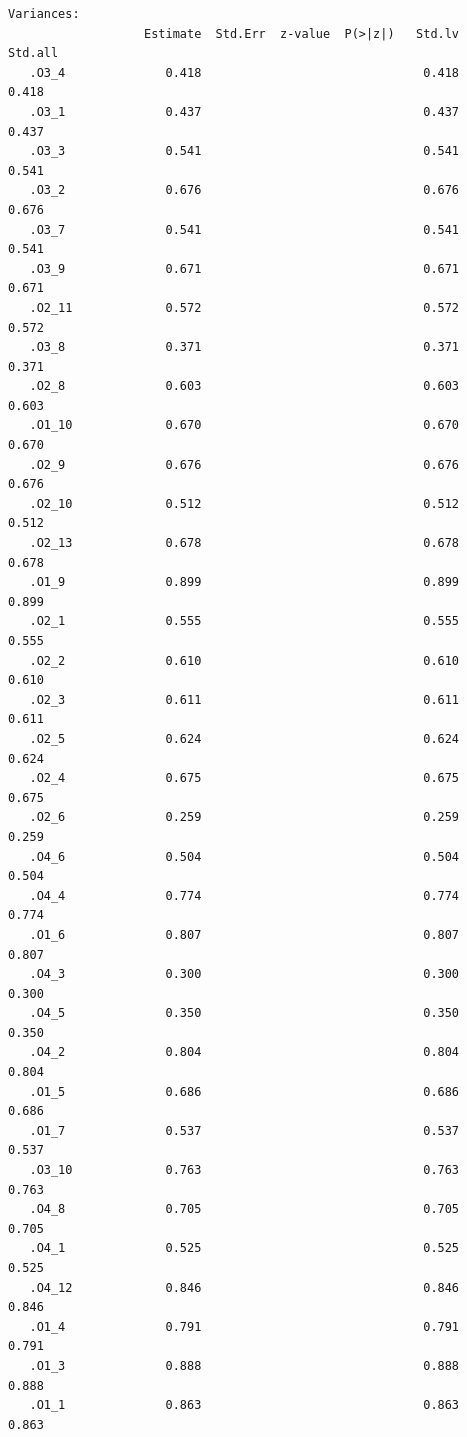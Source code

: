 \documentclass[
  letterpaper,
  DIV=11,
  numbers=noendperiod]{scrartcl}
\begin{document}
\begin{verbatim}
Variances:
                   Estimate  Std.Err  z-value  P(>|z|)   Std.lv  Std.all
   .O3_4              0.418                               0.418    0.418
   .O3_1              0.437                               0.437    0.437
   .O3_3              0.541                               0.541    0.541
   .O3_2              0.676                               0.676    0.676
   .O3_7              0.541                               0.541    0.541
   .O3_9              0.671                               0.671    0.671
   .O2_11             0.572                               0.572    0.572
   .O3_8              0.371                               0.371    0.371
   .O2_8              0.603                               0.603    0.603
   .O1_10             0.670                               0.670    0.670
   .O2_9              0.676                               0.676    0.676
   .O2_10             0.512                               0.512    0.512
   .O2_13             0.678                               0.678    0.678
   .O1_9              0.899                               0.899    0.899
   .O2_1              0.555                               0.555    0.555
   .O2_2              0.610                               0.610    0.610
   .O2_3              0.611                               0.611    0.611
   .O2_5              0.624                               0.624    0.624
   .O2_4              0.675                               0.675    0.675
   .O2_6              0.259                               0.259    0.259
   .O4_6              0.504                               0.504    0.504
   .O4_4              0.774                               0.774    0.774
   .O1_6              0.807                               0.807    0.807
   .O4_3              0.300                               0.300    0.300
   .O4_5              0.350                               0.350    0.350
   .O4_2              0.804                               0.804    0.804
   .O1_5              0.686                               0.686    0.686
   .O1_7              0.537                               0.537    0.537
   .O3_10             0.763                               0.763    0.763
   .O4_8              0.705                               0.705    0.705
   .O4_1              0.525                               0.525    0.525
   .O4_12             0.846                               0.846    0.846
   .O1_4              0.791                               0.791    0.791
   .O1_3              0.888                               0.888    0.888
   .O1_1              0.863                               0.863    0.863

\end{verbatim}
\end{document}
